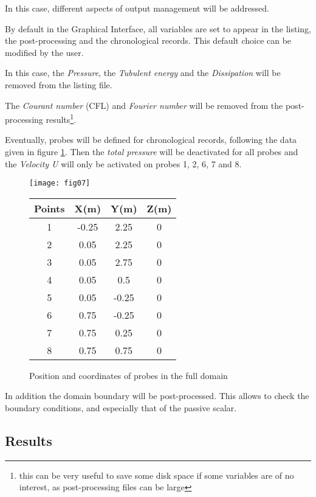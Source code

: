 In this case, different aspects of output management will be addressed.

By default in the Graphical Interface, all variables are set to appear in the
listing, the post-processing and the chronological records. This default choice
can be modified by the user.

In this case, the {\itshape Pressure}, the {\itshape Tubulent energy} and the
{\itshape Dissipation} will be removed from the listing file.

The {\itshape Courant number} (CFL) and {\itshape Fourier number} will be
removed from the
post-processing results\footnote{this can be very useful to save some disk space
if some variables are of no interest, as post-processing files can be large}.

Eventually, probes will be defined for chronological records, following the data
given in figure \ref{figante25}. Then the {\itshape total pressure} will be
deactivated for all probes and the {\itshape Velocity U} will only be activated
on probes  1, 2, 6, 7 and 8.

\begin{figure}[htp]
\parbox{8cm}{%
\centerline{\texttt{[image: fig07]}}}
\parbox{7cm}{%
\begin{center}
\begin{tabular}{|c|c|c|c|}
\hline
Points & X(m) & Y(m) & Z(m)\\
\hline
1 & -0.25 & 2.25 & 0 \\
\hline
2 & 0.05 & 2.25 & 0 \\
\hline
3 & 0.05 & 2.75 & 0 \\
\hline
4 & 0.05 & 0.5 & 0 \\
\hline
5 & 0.05 & -0.25 & 0 \\
\hline
6 & 0.75 & -0.25 & 0 \\
\hline
7 & 0.75 & 0.25 & 0 \\
\hline
8 & 0.75 & 0.75 & 0 \\
\hline
\end{tabular}
\end{center}
}
\caption{Position and coordinates of probes in the full domain}
\label{figante25}
\end{figure}

In addition the domain boundary will be post-processed. This allows to check the
boundary conditions, and especially that of the passive scalar.


        \subsection{Results}

